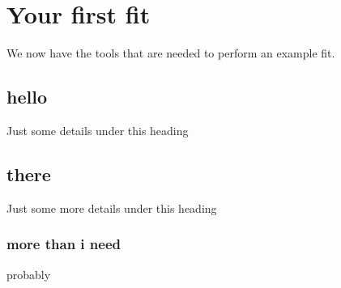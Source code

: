 \section{Your first fit}

We now have the tools that are needed to perform an example fit.


\subsection{hello}

Just some details under this heading


\subsection{there}

Just some more details under this heading

\subsubsection{more than i need}

probably